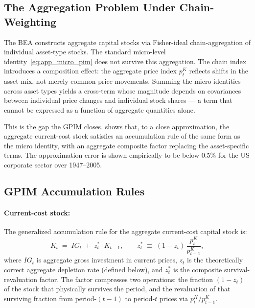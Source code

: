 \subsection{The Aggregation Problem Under Chain-Weighting}
\label{app:gpim_aggregation}

The BEA constructs aggregate capital stocks via Fisher-ideal
chain-aggregation of individual asset-type stocks. The standard
micro-level identity~\eqref{eq:app_micro_pim} does not survive this
aggregation. The chain index introduces a composition effect: the
aggregate price index $p_t^{K}$ reflects shifts in the asset mix, not
merely common price movements. Summing the micro identities across asset
types yields a cross-term whose magnitude depends on covariances between
individual price changes and individual stock shares --- a term that
cannot be expressed as a function of aggregate quantities alone.

This is the gap the GPIM closes. \citet[Appendix~6.5, \S V]{Shaikh2016}
shows that, to a close approximation, the aggregate current-cost stock
satisfies an accumulation rule of the same form as the micro identity,
with an aggregate composite factor replacing the asset-specific terms.
The approximation error is shown empirically to be below 0.5\% for the
US corporate sector over 1947--2005.


\subsection{GPIM Accumulation Rules}
\label{app:gpim_rules}

\paragraph{Current-cost stock:}
The generalized accumulation rule for the aggregate current-cost capital
stock is:
%
\begin{equation}
  \label{eq:app_gpim_nom}
  K_t \;=\; IG_t \;+\; z_t^{\ast}\cdot K_{t-1},
  \qquad
  z_t^{\ast} \;\equiv\; (1 - z_t)\,\frac{p_t^{K}}{p_{t-1}^{K}},
\end{equation}
%
where $IG_t$ is aggregate gross investment in current prices, $z_t$ is
the theoretically correct aggregate depletion rate (defined below), and
$z_t^{\ast}$ is the composite survival-revaluation factor. The factor
compresses two operations: the fraction $(1-z_t)$ of the stock that
physically survives the period, and the revaluation of that surviving
fraction from period-$(t-1)$ to period-$t$ prices via
$p_t^{K}/p_{t-1}^{K}$.

